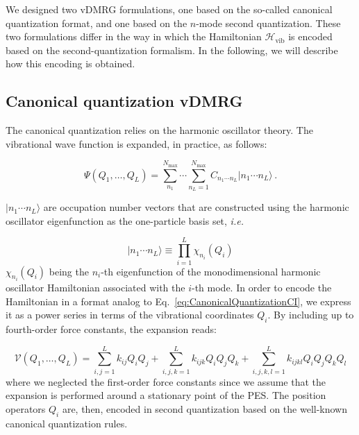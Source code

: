 \documentclass[bibliography=totoc,12pt,a4paper]{scrartcl}
\begin{document}
We designed two vDMRG formulations, one based on the so-called canonical quantization format,\cite{Hirata2014_NormalOrdered} and one based on the $n$-mode second quantization.\cite{Christiansen2004_nModeQuantization}
These two formulations differ in the way in which the Hamiltonian $\mathcal{H}_\text{vib}$ is encoded based on the second-quantization formalism.
In the following, we will describe how this encoding is obtained.

\subsection{Canonical quantization vDMRG}
\label{sec:canonical}

The canonical quantization relies on the harmonic oscillator theory.\cite{Hirata2014_NormalOrdered}
The vibrational wave function is expanded, in practice, as follows:

\begin{equation}
  \Psi(Q_1, \ldots, Q_L) = \sum_{n_1}^{N_\text{max}} \cdots \sum_{n_L=1}^{N_\text{max}}
	C_{n_1 \cdots n_L} | n_1 \cdots n_L \rangle \, .
  \label{eq:CanonicalQuantizationCI}
\end{equation}

$| n_1 \cdots n_L \rangle$ are occupation number vectors that are constructed using the harmonic oscillator eigenfunction as the one-particle basis set, \textit{i.e.}

\begin{equation}
  | n_1 \cdots n_L \rangle \equiv \prod_{i=1}^L \chi_{n_i}(Q_i)
  \label{eq:HarmonicOscillatorBasis}
\end{equation}
%
$\chi_{n_i}(Q_i)$ being the $n_i$-th eigenfunction of the monodimensional harmonic oscillator Hamiltonian associated with the $i$-th mode.
In order to encode the Hamiltonian in a format analog to Eq.~\ref{eq:CanonicalQuantizationCI}, we express it as a power series in terms of the vibrational coordinates $Q_i$.
By including up to fourth-order force constants, the expansion reads:

\begin{equation}
  \mathcal{V}(Q_1, \ldots, Q_L) = \sum_{i,j=1}^L k_{ij} Q_i Q_j + \sum_{i,j,k=1}^L k_{ijk} Q_i Q_j Q_k
    + \sum_{i,j,k,l=1}^L k_{ijkl} Q_i Q_j Q_k Q_l
  \label{eq:TaylorExpansion}
\end{equation}
%
where we neglected the first-order force constants since we assume that the expansion is performed around a stationary point of the PES.
The position operators $Q_i$ are, then, encoded in second quantization based on the well-known canonical quantization rules.
\end{document}
